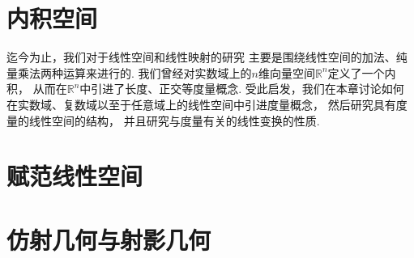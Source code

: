 \chapter{内积空间}
迄今为止，我们对于线性空间和线性映射的研究
主要是围绕线性空间的加法、纯量乘法两种运算来进行的.
我们曾经对实数域上的\(n\)维向量空间\(\mathbb{R}^n\)定义了一个内积，
从而在\(\mathbb{R}^n\)中引进了长度、正交等度量概念.
受此启发，我们在本章讨论如何在实数域、复数域以至于任意域上的线性空间中引进度量概念，
然后研究具有度量的线性空间的结构，
并且研究与度量有关的线性变换的性质.









\chapter{赋范线性空间}


\chapter{仿射几何与射影几何}



